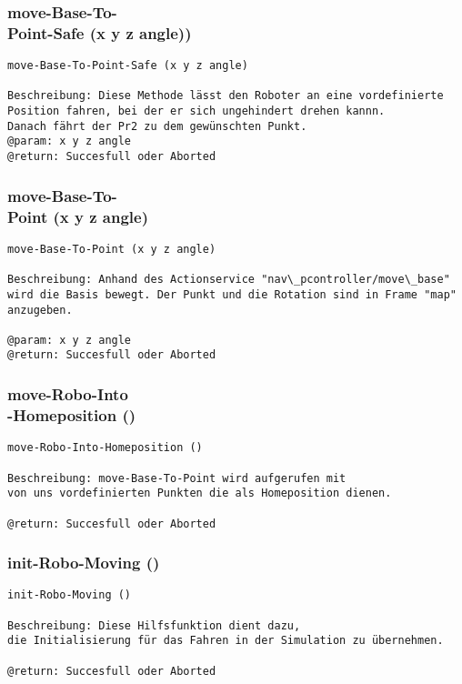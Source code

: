 \documentclass{suturo}
\begin{document}
\subsubsection{move-Base-To-\\
Point-Safe (x y z angle))
}
\begin{verbatim}
move-Base-To-Point-Safe (x y z angle)

Beschreibung: Diese Methode lässt den Roboter an eine vordefinierte 
Position fahren, bei der er sich ungehindert drehen kannn.
Danach fährt der Pr2 zu dem gewünschten Punkt.
@param: x y z angle
@return: Succesfull oder Aborted
\end{verbatim}


\subsubsection{move-Base-To-\\
Point (x y z angle)}
\begin{verbatim}
move-Base-To-Point (x y z angle)

Beschreibung: Anhand des Actionservice "nav\_pcontroller/move\_base" 
wird die Basis bewegt. Der Punkt und die Rotation sind in Frame "map" anzugeben.

@param: x y z angle
@return: Succesfull oder Aborted
\end{verbatim}


\subsubsection{move-Robo-Into\\
-Homeposition ()}
\begin{verbatim}
move-Robo-Into-Homeposition ()

Beschreibung: move-Base-To-Point wird aufgerufen mit 
von uns vordefinierten Punkten die als Homeposition dienen.

@return: Succesfull oder Aborted
\end{verbatim}


\subsubsection{init-Robo-Moving ()}
\begin{verbatim}
init-Robo-Moving ()

Beschreibung: Diese Hilfsfunktion dient dazu,
die Initialisierung für das Fahren in der Simulation zu übernehmen.

@return: Succesfull oder Aborted
\end{verbatim}
\end{document}
